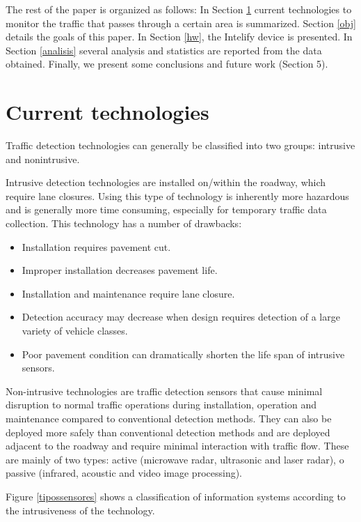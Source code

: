 \documentclass{llncs}
\begin{document}
The rest of the paper is organized as follows:
In Section \ref{soa} current technologies to monitor the traffic that passes through a certain area is summarized.
Section \ref{obj} details the goals of this paper.
In Section \ref{hw}, the Intelify device is presented.
In Section \ref{analisis} several analysis and statistics are reported from the data obtained.
Finally, we present some conclusions and future work (Section 5).


\section{Current technologies}
\label{soa}

Traffic detection technologies can generally be classified into two groups: intrusive and nonintrusive.

Intrusive detection technologies are installed on/within the roadway, which require lane closures. Using this type of technology is inherently more hazardous and is generally more time consuming, especially for temporary traffic data collection. This technology has a number of drawbacks:
\begin{itemize}
  \item Installation requires pavement cut.
  \item Improper installation decreases pavement life.
  \item Installation and maintenance require lane closure.
  \item Detection accuracy may decrease when design requires detection of a large variety of vehicle classes.
  \item Poor pavement condition can dramatically shorten the life span of intrusive sensors.
\end{itemize}

Non-intrusive technologies are traffic detection sensors that cause minimal disruption to normal traffic operations during installation, operation and maintenance compared to conventional detection methods. They can also be deployed more safely than conventional detection methods and are deployed adjacent to the roadway and require minimal interaction with traffic flow. These are mainly of two types: active (microwave radar, ultrasonic and laser radar), o passive (infrared, acoustic and video image processing). 

Figure \ref{tipossensores} shows a classification of information systems according to the intrusiveness of the technology.
\end{document}
